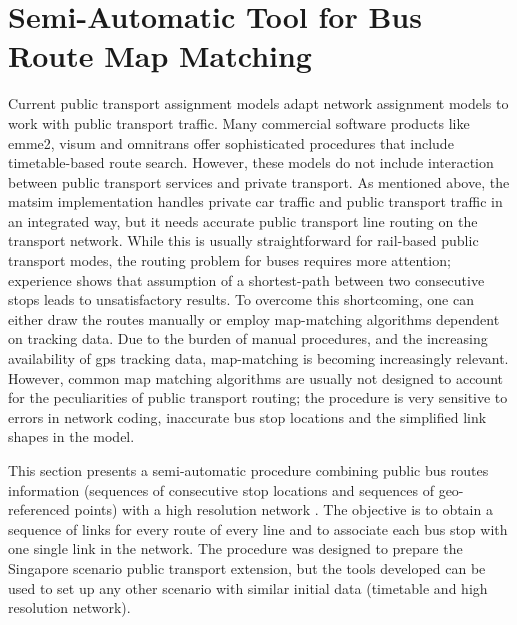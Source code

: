 \chapter{Semi-Automatic Tool for Bus Route Map Matching}
\label{sec:SemiTool}
Current public transport assignment models adapt network assignment models to work with public transport traffic. Many commercial software products like \gls{emme2}, \gls{visum} and \gls{omnitrans} offer sophisticated procedures that include timetable-based route search. However, these models do not include interaction between public transport services and private transport. As mentioned above, the \gls{matsim} implementation handles private car traffic and public transport traffic in an integrated way, but it needs accurate public transport line routing on the transport network. While this is usually straightforward for rail-based public transport modes, the routing problem for buses requires more attention; experience shows that assumption of a shortest-path between two consecutive stops leads to unsatisfactory results. To overcome this shortcoming, one can either draw the routes manually or employ map-matching algorithms dependent on tracking data. Due to the burden of manual procedures, and the increasing availability of \gls{gps} tracking data, map-matching is becoming increasingly relevant. However, common map matching algorithms are usually not designed to account for the peculiarities of public transport routing; the procedure is very sensitive to errors in network coding, inaccurate bus stop locations and the simplified  link shapes in the model.

This section presents a semi-automatic procedure combining public bus routes information (sequences of consecutive stop locations and sequences of geo-referenced points) with a high resolution network \citep[][]{Ordonez_HKSTS_2011}. The objective is to obtain a sequence of links for every route of every line and to associate each bus stop with one single link in the network. The procedure was designed to prepare the Singapore scenario public transport extension, but the tools developed can be used to set up any other scenario with similar initial data (timetable and high resolution network).

